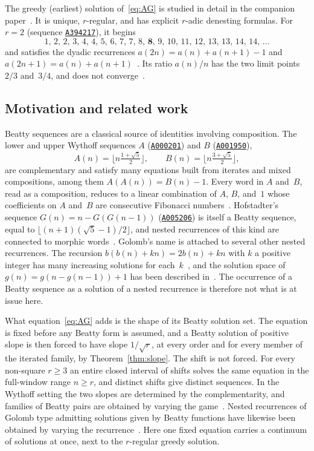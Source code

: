 \documentclass{birkjour}
\theoremstyle{definition}
\theoremstyle{remark}
\newcommand{\fl}[1]{\lfloor #1 \rfloor}
\begin{document}
The greedy (earliest) solution of~\eqref{eq:AG}
is studied in detail in the companion
paper~\cite{Cloitre_AG}. It is unique, $r$-regular,
and has explicit $r$-adic denesting
formulas. For $r=2$ (sequence
\href{https://oeis.org/A394217}{\texttt{A394217}}), it begins
\[
  1,\, 2,\, 2,\, 3,\, 4,\, 4,\, 5,\, 6,\, 7,\, 7,\,
  8,\, \mathbf{8},\, 9,\, 10,\, 11,\, 12,\, 13,\,
  13,\, 14,\, 14,\, \ldots
\]
and satisfies the dyadic recurrences
$a(2n)=a(n)+a(n{+}1)-1$ and
$a(2n{+}1)=a(n)+a(n{+}1)$~\cite{Cloitre_AG}.
Its ratio $a(n)/n$ has the two limit points $2/3$
and~$3/4$, and does not converge~\cite{Cloitre_AG}.

\subsection{Motivation and related work}

Beatty sequences are a classical source of identities
involving composition. The lower and upper Wythoff
sequences $A$
(\href{https://oeis.org/A000201}{\texttt{A000201}}) and $B$
(\href{https://oeis.org/A001950}{\texttt{A001950}}),
\[
  A(n)=\fl{n\tfrac{1+\sqrt{5}}{2}},
  \qquad
  B(n)=\fl{n\tfrac{3+\sqrt{5}}{2}},
\]
are complementary and satisfy many equations built from
iterates and mixed compositions, among them
$A(A(n))=B(n)-1$. Every word in $A$ and~$B$, read as a
composition, reduces to a linear combination of $A$, $B$,
and~$1$ whose coefficients on $A$ and~$B$ are consecutive
Fibonacci numbers~\cite{KimberlingWythoff}. Hofstadter's
sequence $G(n)=n-G(G(n{-}1))$
(\href{https://oeis.org/A005206}{\texttt{A005206}}) is
itself a Beatty sequence,
equal to $\fl{(n{+}1)(\sqrt{5}-1)/2}$, and nested
recurrences of this kind are connected to morphic
words~\cite{CelayaRuskey}. Golomb's name is attached to
several other nested recurrences. The recursion
$b(b(n)+kn)=2b(n)+kn$ with $k$ a positive integer has many
increasing solutions for each~$k$~\cite{BarbeauTanny}, and
the solution space of $g(n)=g(n{-}g(n{-}1))+1$ has been
described in~\cite{SunoharaTanny}. The occurrence of a
Beatty sequence as a solution of a nested recurrence is
therefore not what is at issue here.

What equation~\eqref{eq:AG} adds is the shape of its Beatty
solution set. The equation is fixed before any Beatty form
is assumed, and a Beatty solution of positive slope is then
forced to have slope $1/\!\sqrt{r}$, at every order and for
every member of the iterated family, by
Theorem~\ref{thm:slope}. The shift is not forced. For every
non-square $r\ge 3$ an entire closed interval of shifts
solves the same equation in the full-window range $n\ge r$,
and distinct shifts give distinct sequences. In the Wythoff
setting the two slopes are determined by the
complementarity, and families of Beatty pairs are obtained
by varying the game~\cite{Larsson}.
Nested recurrences of Golomb type admitting solutions given
by Beatty functions have likewise been obtained by varying
the recurrence~\cite{IsgurKimMilcakTanny}. Here one
fixed equation carries a continuum of solutions at once,
next to the $r$-regular greedy solution.
\end{document}
